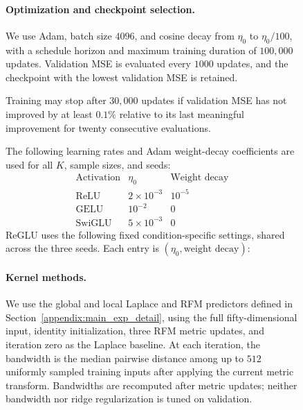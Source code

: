 \documentclass{article}
\newcounter{setting}[section]
\newcounter{initialization}[section]
\begin{document}
\begin{figure}
\paragraph{Optimization and checkpoint selection.}
We use Adam, batch size \(4096\), and cosine decay from \(\eta_0\) to
\(\eta_0/100\), with a schedule horizon and maximum training duration of
\(100{,}000\) updates. Validation MSE is evaluated every \(1000\) updates, and the
checkpoint with the lowest validation MSE is retained.

Training may stop after \(30{,}000\) updates if validation MSE has not
improved by at least \(0.1\%\) relative to its last meaningful improvement
for twenty consecutive evaluations.

The following learning rates and Adam weight-decay coefficients are
used for all \(K\), sample sizes, and seeds:
\[
\begin{array}{lcc}
\text{Activation} & \eta_0 & \text{Weight decay}\\
\hline
\text{ReLU}   & 2\times10^{-3} & 10^{-5}\\
\text{GELU}   & 10^{-2}        & 0\\
\text{SwiGLU} & 5\times10^{-3} & 0
\end{array}
\]
ReGLU uses the following fixed condition-specific settings, shared
across the three seeds. Each entry is
\((\eta_0,\text{weight decay})\):
\begin{center}
\end{center}
\paragraph{Kernel methods.}
We use the global and local Laplace and RFM predictors defined in
Section~\ref{appendix:main_exp_detail}, using the full fifty-dimensional
input, identity initialization, three RFM metric updates, and
iteration zero as the Laplace baseline. At each iteration, the bandwidth is the
median pairwise distance
among up to \(512\) uniformly sampled training inputs after applying
the current metric transform. Bandwidths are recomputed after metric
updates; neither bandwidth nor ridge regularization is tuned on validation.


\end{figure}
\end{document}
